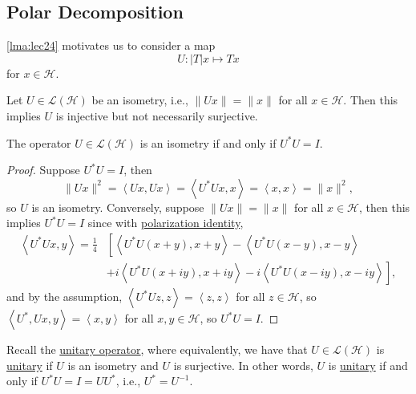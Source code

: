 \subsection{Polar Decomposition}
\autoref{lma:lec24} motivates us to consider a map
\[
	U\colon \vert T \vert x \mapsto Tx
\]
for \(x\in \mathcal{H} \).

Let \(U\in \mathcal{L} (\mathcal{H} )\) be an isometry, i.e., \(\lVert Ux \rVert = \lVert x \rVert \) for all \(x\in \mathcal{H} \). Then this implies \(U\) is injective but not necessarily surjective.

\begin{lemma}
	The operator \(U\in \mathcal{L} (\mathcal{H} )\) is an isometry if and only if \(U^{\ast} U = I\).
\end{lemma}
\begin{proof}
	Suppose \(U^{\ast} U = I\), then
	\[
		\lVert Ux \rVert ^2
		= \left\langle Ux, Ux \right\rangle
		= \left\langle U^{\ast} Ux, x \right\rangle
		= \left\langle x, x \right\rangle
		= \lVert x \rVert ^2,
	\]
	so \(U\) is an isometry. Conversely, suppose \(\lVert Ux \rVert = \lVert x \rVert \) for all \(x\in \mathcal{H} \), then this implies \(U^{\ast} U = I\) since with \hyperref[lma:polarization-identity]{polarization identity},
	\[
		\begin{split}
			\left\langle U^{\ast} Ux, y \right\rangle
			= \frac{1}{4} &\left[ \left\langle U^{\ast} U(x+y), x+y \right\rangle - \left\langle U^{\ast} U(x-y), x-y \right\rangle \right.\\
				&+ \left. i\left\langle U^{\ast} U(x+iy), x+iy \right\rangle - i\left\langle U^{\ast} U(x-iy), x-iy \right\rangle \right],
		\end{split}
	\]
	and by the assumption, \(\left\langle U^{\ast} Uz, z \right\rangle = \left\langle z, z \right\rangle \) for all \(z\in \mathcal{H} \), so \(\left\langle U^{\ast} , Ux, y \right\rangle = \left\langle x, y \right\rangle \) for all \(x, y\in \mathcal{H} \), so \(U^{\ast} U = I\).
\end{proof}

Recall the \hyperref[def:unitary-op]{unitary operator}, where equivalently, we have that \(U\in \mathcal{L} (\mathcal{H} )\) is \hyperref[def:unitary-op]{unitary} if \(U\) is an isometry and \(U\) is surjective. In other words, \(U\) is \hyperref[def:unitary-op]{unitary} if and only if \(U^{\ast} U = I = U U^{\ast} \), i.e., \(U^{\ast} = U ^{-1} \).

